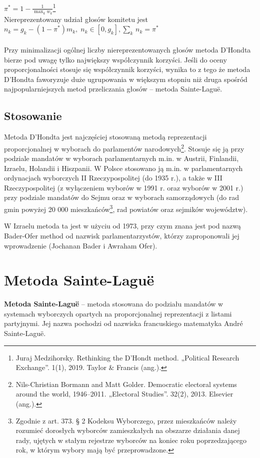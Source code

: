 \documentclass[12pt,a4paper,titlepage]{report}
\begin{document}
\begin{math}\pi ^{*}=1-{\frac {1}{\max _{k}w_{k}}}\end{math}\footnote[2]{Juraj Medzihorsky. Rethinking the D’Hondt method. „Political Research Exchange”. 1(1), 2019. Taylor \& Francis (ang.).} \\
Niereprezentowany udział głosów komitetu jest
\begin{math} n_{k}=g_{k}-(1-\pi ^{*})m_{k},\;n_{k}\in [0,g_{k}],\sum _{k}\,n_{k}=\pi ^{*}\end{math}\footnotemark[2]
 \\ \\
Przy minimalizacji ogólnej liczby niereprezentowanych głosów metoda D’Hondta bierze pod uwagę tylko największy współczynnik korzyści. Jeśli do oceny proporcjonalności stosuje się współczynnik korzyści, wynika to z tego że metoda D’Hondta faworyzuje duże ugrupowania w większym stopniu niż druga spośród najpopularniejszych metod przeliczania głosów – metoda Sainte-Laguë.
\newpage
\section{Stosowanie}
Metoda D’Hondta jest najczęściej stosowaną metodą reprezentacji proporcjonalnej w wyborach do parlamentów narodowych\footnote[3]{Nils-Christian Bormann and Matt Golder. Democratic electoral systems around the world, 1946--2011. „Electoral Studies”. 32(2), 2013. Elsevier (ang.).}. Stosuje się ją przy podziale mandatów w wyborach parlamentarnych m.in. w Austrii, Finlandii, Izraelu, Holandii i Hiszpanii. W Polsce stosowano ją m.in. w parlamentarnych ordynacjach wyborczych II Rzeczypospolitej (do 1935 r.), a także w III Rzeczypospolitej (z wyłączeniem wyborów w 1991 r. oraz wyborów w 2001 r.) przy podziale mandatów do Sejmu oraz w wyborach samorządowych (do rad gmin powyżej 20 000 mieszkańców\footnote[4]{ Zgodnie z art. 373. § 2 Kodeksu Wyborczego, przez mieszkańców należy rozumieć dorosłych wyborców zamieszkałych na obszarze działania danej rady, ujętych w stałym rejestrze wyborców na koniec roku poprzedzającego rok, w którym wybory mają być przeprowadzone.}, rad powiatów oraz sejmików województw).

W Izraelu metoda ta jest w użyciu od 1973, przy czym znana jest pod nazwą Bader-Ofer method od nazwisk parlamentarzystów, którzy zaproponowali jej wprowadzenie (Jochanan Bader i Awraham Ofer).\cite{tdos}
\newpage
\chapter{Metoda Sainte-Laguë}
\textbf{Metoda Sainte-Laguë} – metoda stosowana do podziału mandatów w systemach wyborczych opartych na proporcjonalnej reprezentacji z listami partyjnymi. Jej nazwa pochodzi od nazwiska francuskiego matematyka André Sainte-Laguë.
\end{document}

